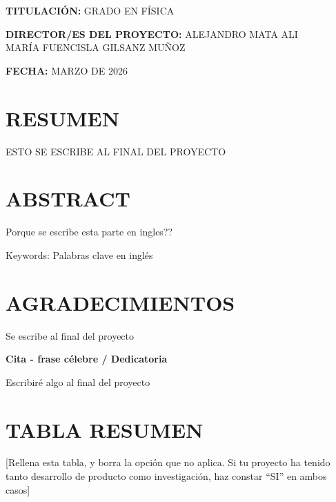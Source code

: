 \documentclass[11pt,a4paper]{report}
\newcommand{\TemplateText}[1]{\textcolor{UEred}{#1}}
\begin{document}
\vspace{0.8cm}
\TemplateText{\textbf{TITULACI\'ON:} GRADO EN FÍSICA}

\vspace{0.8cm}
\TemplateText{\textbf{DIRECTOR/ES DEL PROYECTO:} ALEJANDRO MATA ALI}\\
\hspace*{5.5cm}\TemplateText{MARÍA FUENCISLA GILSANZ MUÑOZ}

\vspace{0.8cm}
\TemplateText{\textbf{FECHA:} MARZO DE 2026}

\clearpage

\chapter*{RESUMEN}
ESTO SE ESCRIBE AL FINAL DEL PROYECTO

\chapter*{ABSTRACT}
Porque se escribe esta parte en ingles??

\TemplateText{Keywords: Palabras clave en inglés}

\chapter*{AGRADECIMIENTOS}
Se escribe al final del proyecto

\clearpage
\TemplateText{\textbf{Cita - frase célebre / Dedicatoria}}

\TemplateText{Escribiré algo al final del proyecto}

\chapter*{TABLA RESUMEN}
\TemplateText{[Rellena esta tabla, y borra la opci\'on que no aplica. Si tu proyecto ha tenido tanto desarrollo de producto como investigaci\'on, haz constar ``SI'' en ambos casos]}
\end{document}
